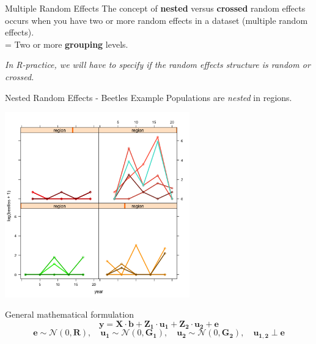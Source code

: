 \documentclass{beamer}
\begin{document}
\begin{frame}
    \centering\Huge{}
\end{frame}

\begin{frame}{Multiple Random Effects}
    \Large
    The concept of \textbf{nested} versus \textbf{crossed} random effects occurs when you have two or more random effects in a dataset (multiple random effects).\\
    = Two or more \textbf{grouping} levels.

    \textit{In R-practice, we will have to specify if the random effects structure is random or crossed.}
\end{frame}

\begin{frame}{Nested Random Effects - Beetles Example}
    \large
    \centering
    Populations are \emph{nested} in regions.

    \includegraphics[width=0.6\textwidth]{lectures/day_5_theory_of_mems/figures/unnamed-chunk-17-1.png}
\end{frame}

\begin{frame}{General mathematical formulation}
    \large
    \[
    \mathbf{y} = \mathbf{X} \cdot \mathbf{b} + \mathbf{Z_1} \cdot \mathbf{u_1} + \mathbf{Z_2} \cdot \mathbf{u_2} + \mathbf{e}
    \]
    \[
    \mathbf{e} \sim \mathcal{N}(0, \mathbf{R}), \quad \mathbf{u_1} \sim \mathcal{N}(0, \mathbf{G_1}), \quad \mathbf{u_2} \sim \mathcal{N}(0, \mathbf{G_2}), \quad \mathbf{u_{1,2}} \; \bot \; \mathbf{e}
    \]
\end{frame}
\end{document}
